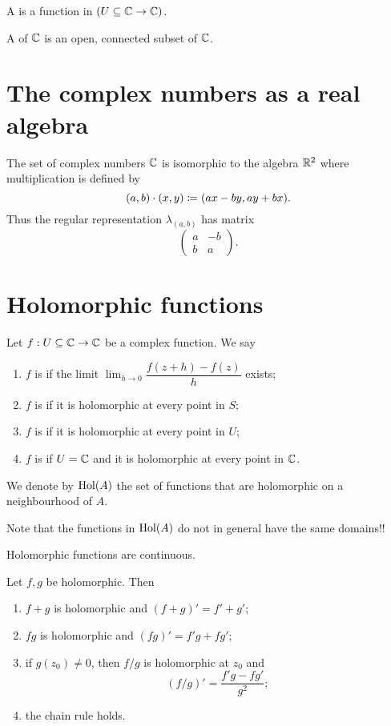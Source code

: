 \begin{definition}
A  is a function in $(U\subseteq \mathbb{C} \to \mathbb{C})$.

A  of $\mathbb{C}$ is an open, connected subset of $\mathbb{C}$.
\end{definition}
\section{The complex numbers as a real algebra}
The set of complex numbers $\mathbb{C}$ is isomorphic to the algebra $\mathbb{R}^2$ where multiplication is defined by
\[ (a, b)\cdot (x, y) \coloneqq (ax-by, ay+bx). \]
Thus the regular representation $\lambda_{(a,b)}$ has matrix
\[ \begin{pmatrix}
a & -b \\ b & a
\end{pmatrix}. \]

\section{Holomorphic functions}
\begin{definition}
Let $f:U\subseteq \mathbb{C} \to \mathbb{C}$ be a complex function. We say
\begin{enumerate}
\item $f$ is  if the limit $\lim_{h\to 0} \dfrac{f(z+h) - f(z)}{h}$
exists;
\item $f$ is  if it is holomorphic at every point in $S$;
\item $f$ is  if it is holomorphic at every point in $U$;
\item $f$ is  if $U=\mathbb{C}$ and it is holomorphic at every point in $\mathbb{C}$.
\end{enumerate}
We denote by $\operatorname{Hol}(A)$ the set of functions that are holomorphic on a neighbourhood of $A$.
\end{definition}
Note that the functions in $\operatorname{Hol}(A)$ do not in general have the same domains!!

\begin{lemma}
Holomorphic functions are continuous.
\end{lemma}
\begin{lemma}
Let $f,g$ be holomorphic. Then
\begin{enumerate}
\item $f+g$ is holomorphic and $(f+g)' = f'+g'$;
\item $fg$ is holomorphic and $(fg)' = f'g+fg'$;
\item if $g(z_0)\neq 0$, then $f/g$ is holomorphic at $z_0$ and
\[ (f/g)' = \frac{f'g - fg'}{g^2}; \]
\item the chain rule holds.
\end{enumerate}
\end{lemma}


